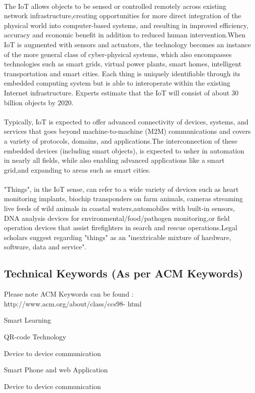 \documentclass[10pt,a4paper]
{article}
\numberwithin{table}{section}
\begin{document}
{{\begin{normalsize}
\paragraph{}{The IoT allows objects to be sensed or controlled remotely across existing network infrastructure,creating opportunities for more direct integration of the physical world into computer-based systems, and resulting in improved efficiency, accuracy and economic benefit in addition to reduced human intervention.When IoT is augmented with sensors and actuators, the technology becomes an instance of the more general class of cyber-physical systems, which also encompasses technologies such as smart grids, virtual power plants, smart homes, intelligent transportation and smart cities. Each thing is uniquely identifiable through its embedded computing system but is able to interoperate within the existing Internet infrastructure. Experts estimate that the IoT will consist of about 30 billion objects by 2020.}
\paragraph{}
{Typically, IoT is expected to offer advanced connectivity of devices, systems, and services that goes beyond machine-to-machine (M2M) communications and covers a variety of protocols, domains, and applications.The interconnection of these embedded devices (including smart objects), is expected to usher in automation in nearly all fields, while also enabling advanced applications like a smart grid,and expanding to areas such as smart cities.}
\paragraph{}
{"Things", in the IoT sense, can refer to a wide variety of devices such as heart monitoring implants, biochip transponders on farm animals, cameras streaming live feeds of wild animals in coastal waters,automobiles with built-in sensors, DNA analysis devices for environmental/food/pathogen monitoring,or field operation devices that assist firefighters in search and rescue operations.Legal scholars suggest regarding "things" as an "inextricable mixture of hardware, software, data and service".}

\subsection{Technical Keywords (As per ACM Keywords)}
Please note ACM Keywords can be found : http://www.acm.org/about/class/ccs98-
html
\begin{itemize}
{\item Smart Learning
\item QR-code Technology
\item Device to device communication
\item Smart Phone and web Application
\item Device to device communication
}
\end{itemize}


\end{normalsize}}}
\end{document}

